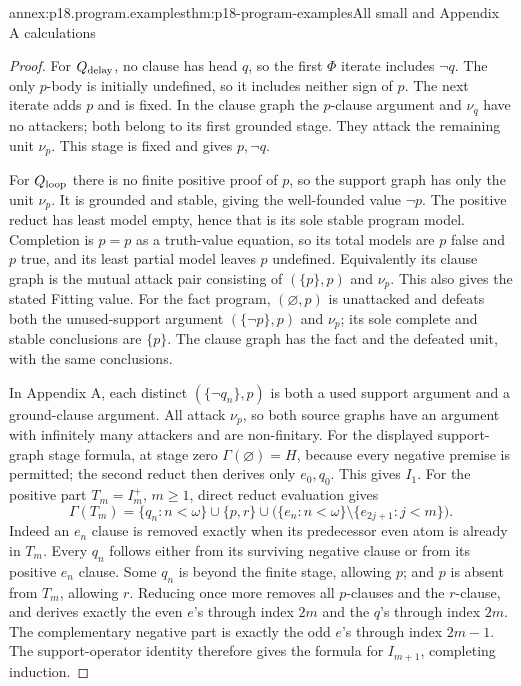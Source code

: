 \begin{annexitem}{annex:p18.program.examples}{thm:p18-program-examples}{All small and Appendix A calculations}
\begin{proof}
For \(Q_{\rm delay}\), no clause has head \(q\),
so the first \(\Phi\) iterate includes \(\neg q\).
The only \(p\)-body is initially undefined, so
it includes neither sign of \(p\). The next
iterate adds \(p\) and is fixed.
In the clause graph the \(p\)-clause argument
and \(\nu_q\) have no attackers; both belong
to its first grounded stage. They attack
the remaining unit \(\nu_p\). This stage
is fixed and gives \(p,\neg q\).

For \(Q_{\rm loop}\) there is no finite
positive proof of \(p\), so the support
graph has only the unit \(\nu_p\).
It is grounded and stable, giving
the well-founded value \(\neg p\).
The positive reduct has least model
empty, hence that is its sole stable
program model. Completion is \(p=p\)
as a truth-value equation, so its
total models are \(p\) false and
\(p\) true, and its least partial
model leaves \(p\) undefined.
Equivalently its clause graph is
the mutual attack pair consisting
of \((\{p\},p)\) and \(\nu_p\).
This also gives the stated Fitting value.
For the fact program, \((\varnothing,p)\)
is unattacked and defeats both the
unused-support argument \((\{\neg p\},p)\)
and \(\nu_p\); its sole complete
and stable conclusions are \(\{p\}\).
The clause graph has the fact and
the defeated unit, with the same
conclusions.

In Appendix A, each distinct
\((\{\neg q_n\},p)\) is both a
used support argument and a
ground-clause argument. All attack
\(\nu_p\), so both source graphs
have an argument with infinitely
many attackers and are non-finitary.
For the displayed support-graph
stage formula, at stage zero
\(\Gamma(\varnothing)=H\), because
every negative premise is permitted;
the second reduct then derives only
\(e_0,q_0\). This gives \(I_1\).
For the positive part \(T_m=I_m^+\),
\(m\geq1\), direct reduct evaluation gives
\[
 \Gamma(T_m)=
 \{q_n:n<\omega\}\cup\{p,r\}
 \cup\bigl(\{e_n:n<\omega\}\setminus
                 \{e_{2j+1}:j<m\}\bigr).
\]
Indeed an \(e_n\) clause is removed
exactly when its predecessor even
atom is already in \(T_m\).
Every \(q_n\) follows either from
its surviving negative clause or
from its positive \(e_n\) clause.
Some \(q_n\) is beyond the finite
stage, allowing \(p\); and \(p\)
is absent from \(T_m\), allowing
\(r\). Reducing once more removes
all \(p\)-clauses and the \(r\)-clause,
and derives exactly the even \(e\)'s
through index \(2m\) and the
\(q\)'s through index \(2m\).
The complementary negative part
is exactly the odd \(e\)'s
through index \(2m-1\).
The support-operator identity
therefore gives the formula for
\(I_{m+1}\), completing induction.


\end{proof}
\end{annexitem}
